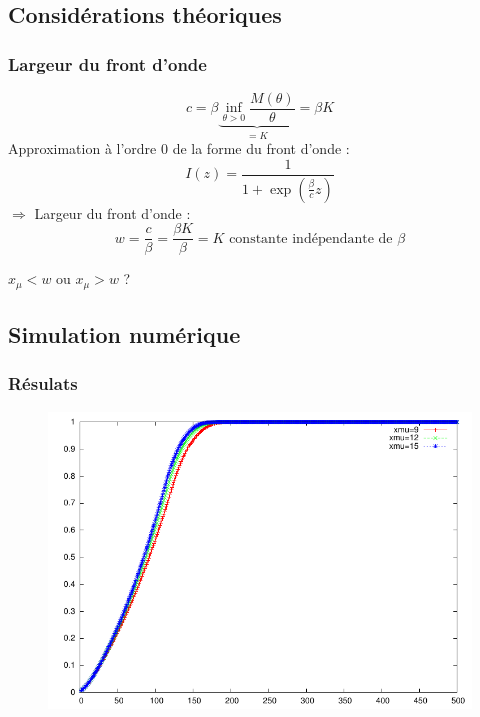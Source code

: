 \documentclass[handout]{beamer}
\begin{document}
\subsection[Théorique]{Considérations théoriques}
\begin{frame}
	\frametitle{Largeur du front d'onde}
\begin{equation}
	c=\beta\underbrace{\inf_{\theta>0} \frac{M(\theta)}{\theta} }_{=K}= \beta K
\end{equation}
Approximation à l'ordre 0 de la forme du front d'onde :
\begin{equation}
	I(z)=\frac{1}{1+\exp\left(\frac{\beta}{c}z\right)}
\end{equation}
$\Rightarrow$ Largeur du front d'onde :
\begin{equation}
	w=\frac{c}{\beta}=\frac{\beta K}{\beta}=K \text{ constante indépendante de }\beta
\end{equation}
\begin{center}$x_{\mu}<w$ ou $x_{\mu}>w$ ? \end{center}
\end{frame}

\subsection[Numérique]{Simulation numérique}
\begin{frame}
	\frametitle{Résulats}
\begin{figure}[!h]
\centering
	\includegraphics[scale=0.75]{img/plot2-2.pdf}
\end{figure}
\end{frame}
\end{document}

